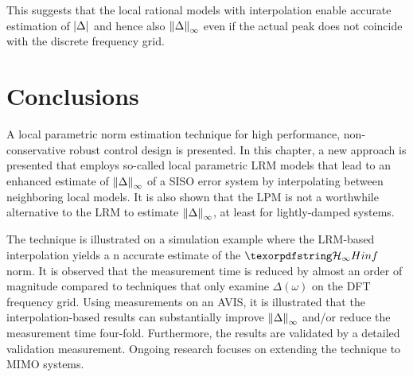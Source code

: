 This suggests that the local rational models with interpolation enable accurate estimation of  $\left| \Delta \right|$ and hence also $\left\| \Delta \right\|_{\infty}$ even if the actual peak does not coincide with the discrete frequency grid.

\section{Conclusions}
\label{sec:lrmhinf:conclusion}
A local parametric \Hinf{} norm estimation technique for high performance, non-conservative robust control design is presented.
In this chapter, a new approach is presented that employs so-called local parametric \gls{LRM} models that lead to an enhanced estimate of $\left\| \Delta \right\|_{\infty}$ of a \gls{SISO} error system by interpolating between neighboring local models.
It is also shown that the \gls{LPM} is not a worthwhile alternative to the \gls{LRM} to estimate $\left\| \Delta \right\|_{\infty}$, at least for lightly-damped systems.

The technique is illustrated on a simulation example where the \gls{LRM}-based interpolation yields a n accurate estimate of the $\Hinf{}$ norm.
It is observed that the measurement time is reduced by almost an order of magnitude compared to techniques that only examine $\Delta(\omega)$ on the \gls{DFT} frequency grid.
Using measurements on an \gls{AVIS}, it is illustrated that the interpolation-based results can substantially improve $\left\| \Delta \right\|_{\infty}$ and/or reduce the measurement time four-fold.
Furthermore, the results are validated by a detailed validation measurement.
Ongoing research focuses on extending the technique to \gls{MIMO} systems.



\begin{subappendices}
  
\end{subappendices}
